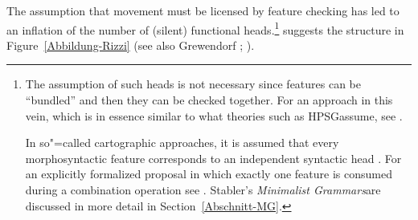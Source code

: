 The assumption that movement must be licensed by feature checking has led to an inflation of the number of (silent) functional 
heads.\footnote{%
	The assumption of such heads is not necessary since features can be ``bundled'' and then they
        can be checked together. For an approach in this vein,
	which is in essence similar to what theories such as HPSG\indexhpsg assume, see .

In so"=called cartographic approaches, it is assumed that every morphosyntactic feature corresponds to an independent syntactic
head \citep[, 61]{CR2010a}. For an explicitly formalized proposal in which exactly one
feature is consumed during a combination operation see . Stabler's \emph{Minimalist
    Grammars}\indexmg are discussed in more detail in Section~\ref{Abschnitt-MG}.
} 
\citet[]{Rizzi97a-u} suggests the structure in Figure~\vref{Abbildung-Rizzi} (see also Grewendorf \citeyear[, 240]{Grewendorf2002a}; \citeyear{Grewendorf2009a}).\pagebreak

